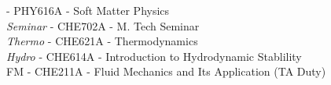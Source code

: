 \documentclass[]{article}
\begin{document}
 - PHY616A - Soft Matter Physics\\
{\color[HTML]{FE0000} \textit{Seminar}} - CHE702A - M. Tech
Seminar\\
{\color[HTML]{FE0000} \textit{Thermo}} - CHE621A - Thermodynamics\\
{\color[HTML]{FE0000} \textit{Hydro}} - CHE614A - Introduction to Hydrodynamic Stablility\\
FM - CHE211A - Fluid Mechanics and Its Application (TA Duty)\\[2 cm]
\end{document}
